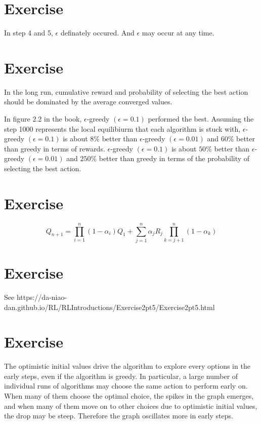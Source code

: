 \documentclass[11pt,a4paper]{report}
\begin{document}
\section{Exercise}

In step 4 and 5, $\epsilon$ definately occured.
And $\epsilon$ may occur at any time.

\section{Exercise}

In the long run, cumulative reward and probability of selecting the best action should be dominated by the average converged values.

In figure 2.2 in the book, $\epsilon$-greedy $(\epsilon = 0.1)$  performed the best.
Assuming the step 1000 represents the local equilibiurm that each algorithm is stuck with,
$\epsilon$-greedy $(\epsilon = 0.1)$ is about $ 8\% $ better than $\epsilon$-greedy $(\epsilon = 0.01)$ and $60\%$ better than greedy in terms of rewards. 
$\epsilon$-greedy $(\epsilon = 0.1)$ is about $ 50\% $ better than $\epsilon$-greedy $(\epsilon = 0.01)$ and $250\%$ better than greedy in terms of the probability of selecting the best action. 

\section{Exercise}

$$ Q_{n+1} = \prod_{i=1}^{n} (1-\alpha_i) Q_1 + \sum_{j=1}^n \alpha_j R_j \prod_{k=j+1}^n (1-\alpha_k) $$

\section{Exercise}
See https://da-niao-dan.github.io/RL/RLIntroductions/Exercise2pt5/Exercise2pt5.html

\section{Exercise}

The optimistic initial values drive the algorithm to explore every options in the early steps, even if the algorithm is greedy. In particular, a large number of individual runs of algorithms may choose the same action to perform early on. When many of them choose the optimal choice, the spikes in the graph emerges, and when many of them move on to other choices due to optimistic initial values, the drop may be steep. Therefore the graph oscillates more in early steps.
\end{document}
